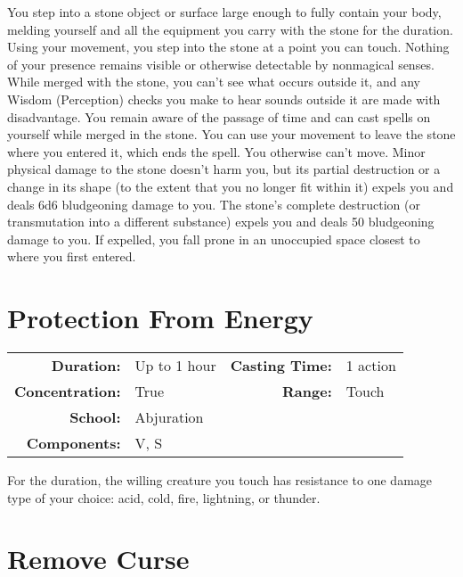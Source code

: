 \documentclass[a5paper, 12pt]{memoir}
\begin{document}
\vspace{1\baselineskip}\noindent You step into a stone object or surface large enough to fully contain your body, melding yourself and all the equipment you carry with the stone for the duration. Using your movement, you step into the stone at a point you can touch. Nothing of your presence remains visible or otherwise detectable by nonmagical senses. While merged with the stone, you can't see what occurs outside it, and any Wisdom (Perception) checks you make to hear sounds outside it are made with disadvantage. You remain aware of the passage of time and can cast spells on yourself while merged in the stone. You can use your movement to leave the stone where you entered it, which ends the spell. You otherwise can't move. Minor physical damage to the stone doesn't harm you, but its partial destruction or a change in its shape (to the extent that you no longer fit within it) expels you and deals 6d6 bludgeoning damage to you. The stone's complete destruction (or transmutation into a different substance) expels you and deals 50 bludgeoning damage to you. If expelled, you fall prone in an unoccupied space closest to where you first entered.

\newpage
\section*{Protection From Energy}

{
\small\centering\vspace{-6pt}
\begin{tabular}{rlrl}
\toprule

\textbf{Duration:} & Up to 1 hour &
\textbf{Casting Time:} & 1 action \\
\textbf{Concentration:} & True &
\textbf{Range:} & Touch \\
\textbf{School:} & Abjuration \\
\textbf{Components:} & \multicolumn{3}{p{0.7\textwidth}}{V, S}\\

\bottomrule
\end{tabular}
}

\vspace{1\baselineskip}\noindent For the duration, the willing creature you touch has resistance to one damage type of your choice: acid, cold, fire, lightning, or thunder.

\newpage
\section*{Remove Curse}
\end{document}
